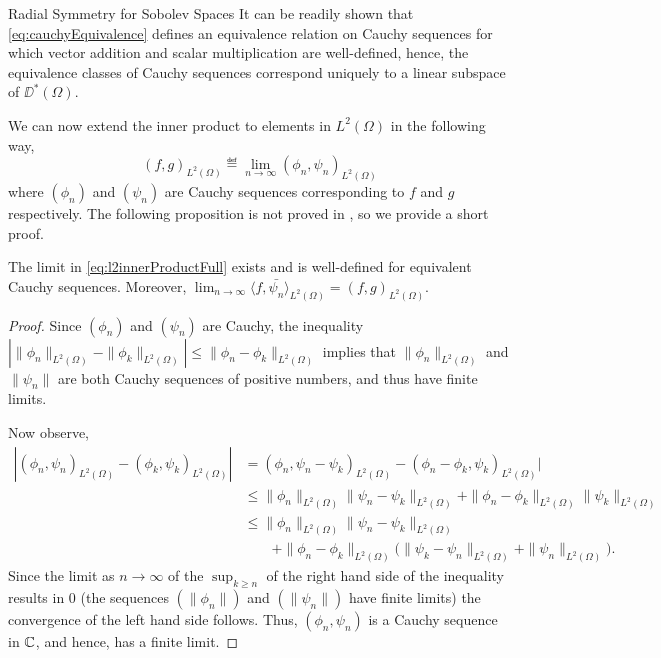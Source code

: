 \begin{chapter}{Radial Symmetry for Sobolev Spaces}
It can be readily shown that \eqref{eq:cauchyEquivalence} defines an equivalence relation on Cauchy sequences for which vector addition and scalar multiplication are well-defined, hence, the equivalence classes of Cauchy sequences correspond uniquely to a linear subspace of $\DD^*(\Omega)$.

We can now extend the inner product to elements in $L^2(\Omega)$ in the following way,
\begin{equation} \label{eq:l2innerProductFull}
  (f,g)_{L^2(\Omega)} \eqdef \lim_{n\to\infty} (\phi_n,\psi_n)_{L^2(\Omega)}
\end{equation}
where $(\phi_n)$ and $(\psi_n)$ are Cauchy sequences corresponding to $f$ and $g$ respectively.
The following proposition is not proved in \citep{richtmyer1978principles}, so we provide a short proof.
\begin{prop}
  The limit in \eqref{eq:l2innerProductFull} exists and is well-defined for equivalent Cauchy sequences. 
  Moreover, $\lim_{n\to\infty} \langle f,\bar{\psi_n}\rangle _{L^2(\Omega)} = (f,g)_{L^2(\Omega)}$.
\end{prop}
\begin{proof}
  Since $(\phi_n)$ and $(\psi_n)$ are Cauchy, the inequality $|\|\phi_n\|_{L^2(\Omega)} - \|\phi_k\|_{L^2(\Omega)}| \le \|\phi_n - \phi_k\|_{L^2(\Omega)}$ implies that $\|\phi_n\|_{L^2(\Omega)}$ and $\|\psi_n\|$ are both Cauchy sequences of positive numbers, and thus have finite limits.

Now observe,
\begin{align}
  |(\phi_n,\psi_n)_{L^2(\Omega)} - (\phi_k,\psi_k)_{L^2(\Omega)}| 
    &= (\phi_n,\psi_n-\psi_k)_{L^2(\Omega)} -(\phi_n-\phi_k,\psi_k)_{L^2(\Omega)}| \nonumber\\
    &\le \|\phi_n\|_{L^2(\Omega)}\|\psi_n-\psi_k\|_{L^2(\Omega)} + \|\phi_n - \phi_k\|_{L^2(\Omega)}\|\psi_k\|_{L^2(\Omega)} \nonumber\\
    &\le \|\phi_n\|_{L^2(\Omega)}\|\psi_n-\psi_k\|_{L^2(\Omega)} \nonumber\\
    &\quad\quad+ \|\phi_n - \phi_k\|_{L^2(\Omega)}\big(\|\psi_k - \psi_n\|_{L^2(\Omega)} + \|\psi_n\|_{L^2(\Omega)}\big).
\end{align}
  Since the limit as $n\to\infty$ of the $\sup_{k\ge n}$ of the right hand side of the inequality results in 0 (the sequences $(\|\phi_n\|)$ and $(\|\psi_n\|)$ have finite limits) the convergence of the left hand side follows.
Thus, $(\phi_n,\psi_n)$ is a Cauchy sequence in $\mathbb C$, and hence, has a finite limit.


\end{proof}
\end{chapter}
